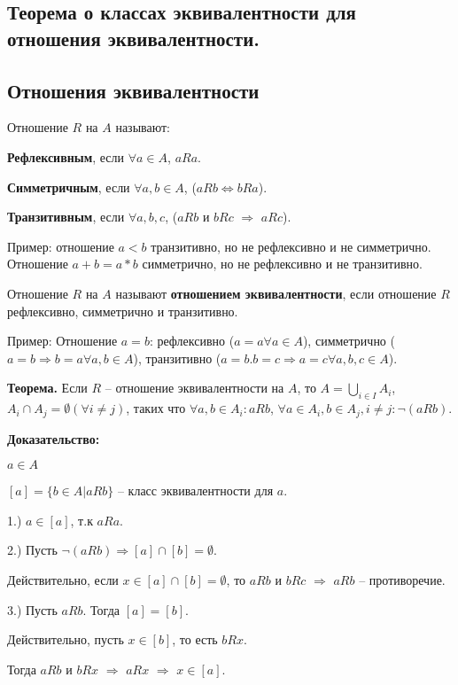 \subsection{Теорема о классах эквивалентности для отношения эквивалентности.}

\subsection{Отношения эквивалентности}

Отношение $R$ на $A$ называют:

\textbf{Рефлексивным}, если $\forall a \in A$, $aRa$.

\textbf{Симметричным}, если $\forall a, b \in A$, ($aRb \Leftrightarrow bRa$).

\textbf{Транзитивным}, если $\forall a, b, c$, ($aRb$ и $bRc$ $\Rightarrow$ $aRc$).

Пример: отношение $a < b$ транзитивно, но не рефлексивно и не симметрично. Отношение $a + b = a * b$ симметрично, но не рефлексивно и не транзитивно.

Отношение $R$ на $A$ называют \textbf{отношением эквивалентности}, если отношение $R$ рефлексивно, симметрично и транзитивно.

Пример: Отношение $a = b$: рефлексивно ($a = a \forall a \in A$), симметрично ($a = b \Rightarrow b = a \forall a, b \in A$), транзитивно ($a = b. b = c \Rightarrow a = c \forall a, b, c \in A$).

\textbf{Теорема.} Если $R$ -- отношение эквивалентности на $A$, то $A = \bigcup_{i \in I}A_i$, $A_i \cap A_j = \emptyset (\forall i \neq j)$, таких что $\forall a, b \in A_i : aRb$, $\forall a \in A_i, b \in A_j, i \neq j : \neg (aRb)$.

\textbf{Доказательство:}

$a \in A$

$[a] = \{b \in A | aRb\}$ -- класс эквивалентности для $a$.

1.) $a \in [a]$, т.к $aRa$.

2.) Пусть $\neg (aRb) \Rightarrow [a] \cap [b] = \emptyset$.

Действительно, если $x \in [a] \cap [b] = \emptyset$, то $aRb$ и  $bRc$
$\Rightarrow$ $aRb$ -- противоречие.

3.) Пусть $aRb$. Тогда $[a] = [b]$.

Действительно, пусть $x \in [b]$, то есть $bRx$.

Тогда $aRb$ и $bRx$ $\Rightarrow$ $aRx$ $\Rightarrow$ $x \in [a]$.


